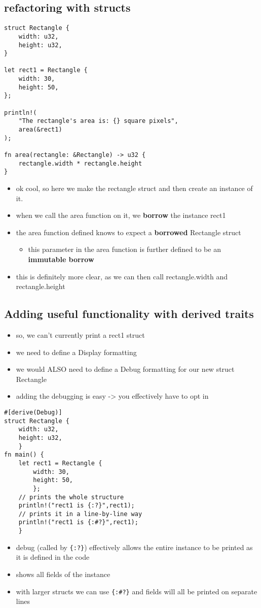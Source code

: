 \documentclass[11pt]{article}
\begin{document}
\subsection{refactoring with structs}
\label{sec:org0f37588}
\begin{verbatim}
struct Rectangle {
    width: u32,
    height: u32,
}

let rect1 = Rectangle {
    width: 30,
    height: 50,
};

println!(
    "The rectangle's area is: {} square pixels",
    area(&rect1)
);

fn area(rectangle: &Rectangle) -> u32 {
    rectangle.width * rectangle.height
}
\end{verbatim}
\begin{itemize}
\item ok cool, so here we make the rectangle struct and then create an instance of it.
\item when we call the area function on it, we \textbf{borrow} the instance rect1
\item the area function defined knows to expect a \textbf{borrowed} Rectangle struct
\begin{itemize}
\item this parameter in the area function is further defined to be an \textbf{immutable borrow}
\end{itemize}
\item this is definitely more clear, as we can then call rectangle.width and rectangle.height
\end{itemize}

\subsection{Adding useful functionality with derived traits}
\label{sec:org17d3b48}
\begin{itemize}
\item so, we can't currently print a rect1 struct
\item we need to define a Display formatting
\item we would ALSO need to define a Debug formatting for our new struct Rectangle
\item adding the debugging is easy -> you effectively have to opt in
\end{itemize}
\begin{verbatim}
#[derive(Debug)]
struct Rectangle {
    width: u32,
    height: u32,
    }
fn main() {
    let rect1 = Rectangle {
        width: 30,
        height: 50,
        };
    // prints the whole structure
    println!("rect1 is {:?}",rect1); 
    // prints it in a line-by-line way
    println!("rect1 is {:#?}",rect1);
    }
\end{verbatim}
\begin{itemize}
\item debug (called by \texttt{\{:?\}}) effectively allows the entire instance to be printed as it is defined in the code
\item shows all fields of the instance
\item with larger structs we can use \texttt{\{:\#?\}} and fields will all be printed on separate lines
\end{itemize}
\end{document}
